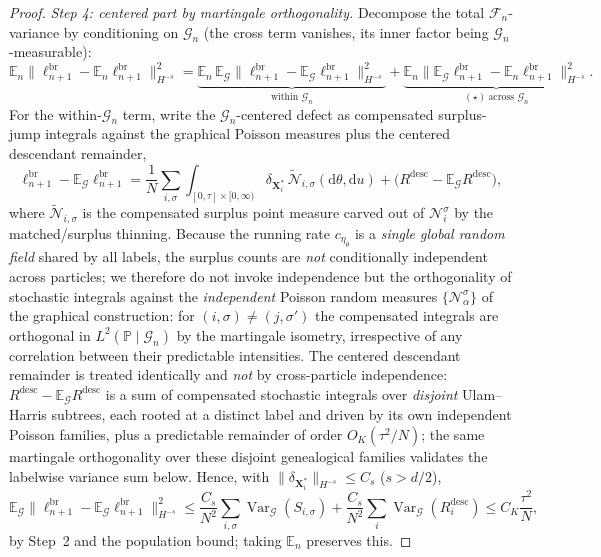 \documentclass[a4paper,fleqn]{cas-sc}
\theoremstyle{definition}
\theoremstyle{remark}
\begin{document}
\begin{proof}
\emph{Step 4: centered part by martingale orthogonality.} Decompose the total
$\mathcal F_n$-variance by conditioning on $\mathcal G_n$ (the cross term vanishes,
its inner factor being $\mathcal G_n$-measurable):
\[
\mathbb E_n\bigl\|\ell^{\mathrm{br}}_{n+1}-\mathbb E_n\ell^{\mathrm{br}}_{n+1}\bigr\|_{H^{-s}}^2
=\underbrace{\mathbb E_n\,\mathbb E_{\mathcal G}\bigl\|\ell^{\mathrm{br}}_{n+1}
-\mathbb E_{\mathcal G}\ell^{\mathrm{br}}_{n+1}\bigr\|_{H^{-s}}^2}_{\text{within }\mathcal G_n}
+\underbrace{\mathbb E_n\bigl\|\mathbb E_{\mathcal G}\ell^{\mathrm{br}}_{n+1}
-\mathbb E_n\ell^{\mathrm{br}}_{n+1}\bigr\|_{H^{-s}}^2}_{(\star)\ \text{across }\mathcal G_n}.
\]
For the within-$\mathcal G_n$ term, write the $\mathcal G_n$-centered defect as
compensated surplus-jump integrals against the graphical Poisson measures plus the
centered descendant remainder,
\[
\ell^{\mathrm{br}}_{n+1}-\mathbb E_{\mathcal G}\ell^{\mathrm{br}}_{n+1}
=\frac1N\sum_{i,\sigma}\int_{[0,\tau]\times[0,\infty)}\delta_{\mathbf X^*_i}\,
\widetilde{\mathcal N}_{i,\sigma}(\mathrm d\theta,\mathrm du)
+\bigl(R^{\mathrm{desc}}-\mathbb E_{\mathcal G}R^{\mathrm{desc}}\bigr),
\]
where $\widetilde{\mathcal N}_{i,\sigma}$ is the compensated surplus point measure
carved out of $\mathcal N^\sigma_i$ by the matched/surplus thinning. Because the
running rate $c_{\eta_\theta}$ is a \emph{single global random field} shared by all
labels, the surplus counts are \emph{not} conditionally independent across
particles; we therefore do not invoke independence but the orthogonality of
stochastic integrals against the \emph{independent} Poisson random measures
$\{\mathcal N^\sigma_\alpha\}$ of the graphical construction: for
$(i,\sigma)\ne(j,\sigma')$ the compensated integrals are orthogonal in
$L^2(\mathbb P\mid\mathcal G_n)$ by the martingale isometry, irrespective of any
correlation between their predictable intensities. The centered descendant
remainder is treated identically and \emph{not} by cross-particle independence:
$R^{\mathrm{desc}}-\mathbb E_{\mathcal G}R^{\mathrm{desc}}$ is a sum of compensated
stochastic integrals over \emph{disjoint} Ulam--Harris subtrees, each rooted at a
distinct label and driven by its own independent Poisson families, plus a
predictable remainder of order $O_K(\tau^2/N)$; the same martingale orthogonality
over these disjoint genealogical families validates the labelwise variance sum
below. Hence, with $\|\delta_{\mathbf X^*_i}\|_{H^{-s}}\le C_s$ ($s>d/2$),
\[
\mathbb E_{\mathcal G}\bigl\|\ell^{\mathrm{br}}_{n+1}-\mathbb E_{\mathcal G}\ell^{\mathrm{br}}_{n+1}\bigr\|_{H^{-s}}^2
\le\frac{C_s}{N^2}\sum_{i,\sigma}\operatorname{Var}_{\mathcal G}(S_{i,\sigma})
+\frac{C_s}{N^2}\sum_i\operatorname{Var}_{\mathcal G}(R^{\mathrm{desc}}_i)
\le C_K\frac{\tau^2}{N},
\]
by Step~2 and the population bound; taking $\mathbb E_n$ preserves this.


\end{proof}
\end{document}
